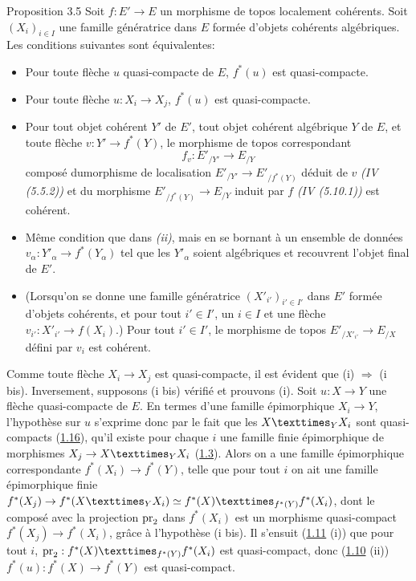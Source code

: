 \documentclass[10pt]{../fichiers-configuration-latex/smfart}
\begin{document}
\begin{enonce*}{Proposition 3.5}
Soit $f : E'\to E$ un morphisme de topos localement cohérents. Soit
$(X_i)_{i \in I}$ une famille génératrice dans $E$ formée d'objets
cohérents algébriques. Les conditions suivantes sont équivalentes:
\begin{itemize}
\item[(i)] Pour toute flèche $u$ quasi-compacte de $E$, $f^{\ast}(u)$
est quasi-compacte.

\item[(i bis)] Pour toute flèche $u : X_i \to X_j$, $f^{\ast}(u)$ est
  quasi-compacte.

\item[(ii)] Pour tout objet cohérent $Y'$ de $E'$, tout objet cohérent
  algébrique $Y$ de $E$, et toute flèche $v : Y'\to f^{\ast}(Y)$, le
  morphisme de topos correspondant
$$
f_v : {E'}_{/Y'} \to E_{/Y}
$$
composé du\pageoriginale morphisme de localisation ${E'}_{/Y'} \to
{E'}_{/f^{\ast}(Y)}$ déduit de $v$ \emph{(IV (5.5.2))} et du morphisme
${E'}_{/f^{\ast}(Y)} \to E_{/Y}$ induit par $f$ \emph{(IV (5.10.1))} est
cohérent.

\item[(ii bis)] Même condition que dans \emph{(ii)}, mais en se bornant à un
  ensemble de données $v_{\alpha} : {Y'}_{\alpha} \to
  f^{\ast}(Y_{\alpha})$ tel que les ${Y'}_{\alpha}$ soient algébriques
  et recouvrent l'objet final de $E'$.

\item[(ii ter)] (Lorsqu'on se donne une famille génératrice
  $(X'_{i'})_{i'\in I'}$ dans $E'$ formée d'objets cohérents, et
  pour tout $i'\in I'$, un $i \in I$ et une flèche $v_{i'} :
  X'_{i'} \to f(X_i)$.) Pour tout $i' \in I'$, le morphisme de
  topos $E'_{/{X'}_{i'}} \to E_{/X}$ défini par $v_i$ est cohérent.
\end{itemize}
\end{enonce*}

Comme toute flèche $X_i \to X_j$ est quasi-compacte, il est évident
que (i) $\Rightarrow$ (i bis). Inversement, supposons (i bis) vérifié
et prouvons (i). Soit $u : X \to Y$ une flèche quasi-compacte de
$E$. En termes d'une famille épimorphique $X_i \to Y$, l'hypothèse sur
$u$ s'exprime donc par le fait que les $\fprod{X}{X_i}{Y}$ sont
quasi-compacts (\hyperref[VI.cor1.16]{1.16}), \ie qu'il existe pour chaque $i$ une famille
finie épimorphique de morphismes $X_j \to \fprod{X}{X_i}{Y}$
(\hyperref[VI.prop1.3]{1.3}). Alors on a une famille épimorphique correspondante
$f^{\ast}(X_i) \to f^{\ast}(Y)$, telle que pour tout $i$ on ait une
famille épimorphique finie $f^{\ast}(X_j) \to
f^{\ast}(\fprod{X}{X_i}{Y}) \simeq
\fprod{f^{\ast}(X)}{f^{\ast}(X_i)}{f^{\ast}(Y)}$, dont le composé avec
la projection $\operatorname{pr}_2$ dans $f^{\ast}(X_i)$ est un morphisme
quasi-compact $f^{\ast}(X_j) \to f^{\ast}(X_i)$, grâce à l'hypothèse
(i bis). Il s'ensuit (\hyperref[VI.cor1.11]{1.11} (i)) que pour tout $i$, $\pr_2 :
\fprod{f^{\ast}(X)}{f^{\ast}(X_i)}{f^{\ast}(Y)}$ est quasi-compact,
donc (\hyperref[VI.prop1.10]{1.10} (ii)) $f^{\ast}(u) : f^{\ast}(X) \to f^{\ast}(Y)$ est quasi-compact.
\end{document}
